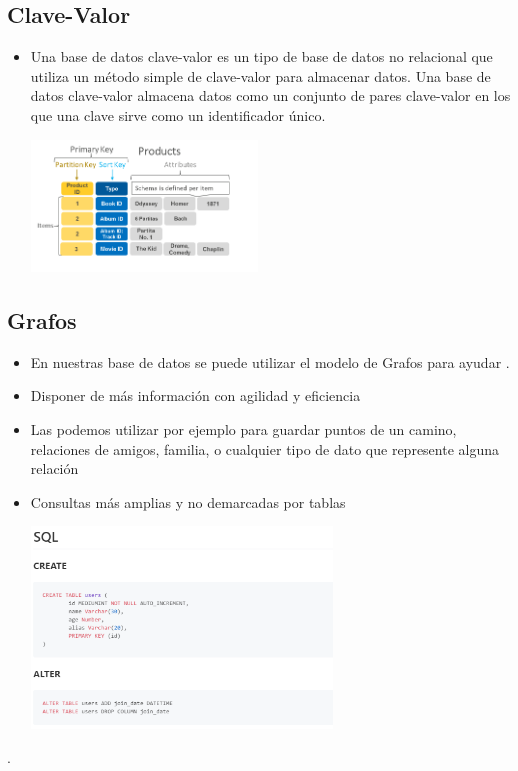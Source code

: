 \documentclass[%
 reprint,
 amsmath,amssymb,
 aps,
]{revtex4-1}
\begin{document}
\subsection{Clave-Valor}
\begin{itemize}

                     \item Una base de datos clave-valor es un tipo de base de datos no relacional que utiliza un método simple de clave-valor para almacenar datos. Una base de datos clave-valor almacena datos como un conjunto de pares clave-valor en los que una clave sirve como un identificador único.
                     \begin{center}
		\includegraphics[width=6cm]{./Imagenes/30}
		\end{center}	
	          \end{itemize}

\subsection{Grafos}
\begin{itemize}
		\item En nuestras base de datos se puede utilizar el modelo de Grafos para ayudar .
		\item Disponer de más información con agilidad y eficiencia
		\item Las podemos utilizar por ejemplo para guardar puntos de un camino, relaciones de amigos, familia, o cualquier tipo de  dato que represente alguna relación
                     \item Consultas más amplias y no demarcadas por tablas
                     \begin{center}
		\includegraphics[width=8cm]{./Imagenes/4}
		\end{center}	
	          \end{itemize}
.
\end{document}

